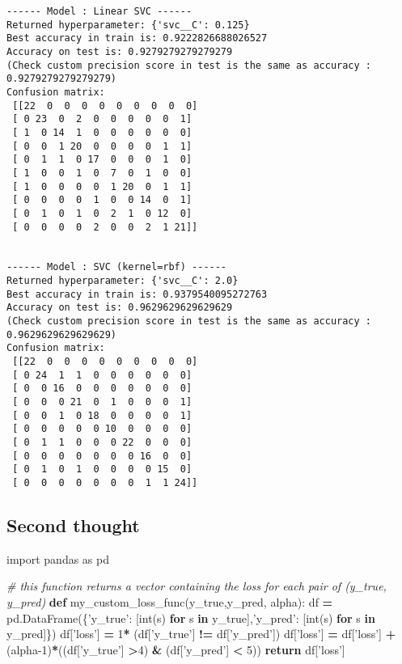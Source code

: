 \documentclass[10pt,a4paper]{article}
\newenvironment{Shaded}{\begin{snugshade}}{\end{snugshade}}
\newcommand{\BuiltInTok}[1]{#1}
\newcommand{\CommentTok}[1]{\textcolor[rgb]{0.56,0.35,0.01}{\textit{#1}}}
\newcommand{\ControlFlowTok}[1]{\textcolor[rgb]{0.13,0.29,0.53}{\textbf{#1}}}
\newcommand{\DecValTok}[1]{\textcolor[rgb]{0.00,0.00,0.81}{#1}}
\newcommand{\ImportTok}[1]{#1}
\newcommand{\KeywordTok}[1]{\textcolor[rgb]{0.13,0.29,0.53}{\textbf{#1}}}
\newcommand{\NormalTok}[1]{#1}
\newcommand{\OperatorTok}[1]{\textcolor[rgb]{0.81,0.36,0.00}{\textbf{#1}}}
\newcommand{\StringTok}[1]{\textcolor[rgb]{0.31,0.60,0.02}{#1}}
\theoremstyle{break}
\begin{document}
\begin{verbatim}
------ Model : Linear SVC ------ 
Returned hyperparameter: {'svc__C': 0.125}
Best accuracy in train is: 0.9222826688026527
Accuracy on test is: 0.9279279279279279
(Check custom precision score in test is the same as accuracy : 0.9279279279279279)
Confusion matrix: 
 [[22  0  0  0  0  0  0  0  0  0]
 [ 0 23  0  2  0  0  0  0  0  1]
 [ 1  0 14  1  0  0  0  0  0  0]
 [ 0  0  1 20  0  0  0  0  1  1]
 [ 0  1  1  0 17  0  0  0  1  0]
 [ 1  0  0  1  0  7  0  1  0  0]
 [ 1  0  0  0  0  1 20  0  1  1]
 [ 0  0  0  0  1  0  0 14  0  1]
 [ 0  1  0  1  0  2  1  0 12  0]
 [ 0  0  0  0  2  0  0  2  1 21]]


------ Model : SVC (kernel=rbf) ------ 
Returned hyperparameter: {'svc__C': 2.0}
Best accuracy in train is: 0.9379540095272763
Accuracy on test is: 0.9629629629629629
(Check custom precision score in test is the same as accuracy : 0.9629629629629629)
Confusion matrix: 
 [[22  0  0  0  0  0  0  0  0  0]
 [ 0 24  1  1  0  0  0  0  0  0]
 [ 0  0 16  0  0  0  0  0  0  0]
 [ 0  0  0 21  0  1  0  0  0  1]
 [ 0  0  1  0 18  0  0  0  0  1]
 [ 0  0  0  0  0 10  0  0  0  0]
 [ 0  1  1  0  0  0 22  0  0  0]
 [ 0  0  0  0  0  0  0 16  0  0]
 [ 0  1  0  1  0  0  0  0 15  0]
 [ 0  0  0  0  0  0  0  1  1 24]]
\end{verbatim}

\hypertarget{second-thought-1}{%
\subsection{Second thought}\label{second-thought-1}}

\begin{Shaded}
\begin{Highlighting}[]
\ImportTok{import}\NormalTok{ pandas }\ImportTok{as}\NormalTok{ pd}

\CommentTok{# this function returns a vector containing the loss for each pair of (y_true, y_pred)}
\KeywordTok{def}\NormalTok{ my_custom_loss_func(y_true,y_pred, alpha):}
\NormalTok{    df }\OperatorTok{=}\NormalTok{ pd.DataFrame(\{}\StringTok{'y_true'}\NormalTok{: [}\BuiltInTok{int}\NormalTok{(s) }\ControlFlowTok{for}\NormalTok{ s }\KeywordTok{in}\NormalTok{ y_true],}\StringTok{'y_pred'}\NormalTok{: [}\BuiltInTok{int}\NormalTok{(s) }\ControlFlowTok{for}\NormalTok{ s }\KeywordTok{in}\NormalTok{ y_pred]\})}
\NormalTok{    df[}\StringTok{'loss'}\NormalTok{] }\OperatorTok{=} \DecValTok{1}\OperatorTok{*}\NormalTok{ (df[}\StringTok{'y_true'}\NormalTok{] }\OperatorTok{!=}\NormalTok{ df[}\StringTok{'y_pred'}\NormalTok{])}
\NormalTok{    df[}\StringTok{'loss'}\NormalTok{] }\OperatorTok{=}\NormalTok{ df[}\StringTok{'loss'}\NormalTok{] }\OperatorTok{+}\NormalTok{ (alpha}\DecValTok{-1}\NormalTok{)}\OperatorTok{*}\NormalTok{((df[}\StringTok{'y_true'}\NormalTok{] }\OperatorTok{>}\DecValTok{4}\NormalTok{) }\OperatorTok{&}\NormalTok{ (df[}\StringTok{'y_pred'}\NormalTok{] }\OperatorTok{<} \DecValTok{5}\NormalTok{))}
    \ControlFlowTok{return}\NormalTok{ df[}\StringTok{'loss'}\NormalTok{]}
\end{Highlighting}
\end{Shaded}
\end{document}

